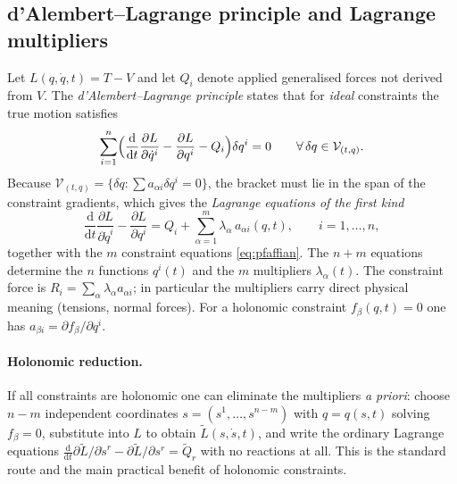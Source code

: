 \documentclass[11pt,a4paper]{article}
\theoremstyle{definition}
\theoremstyle{plain}
\theoremstyle{remark}
\newcommand{\ddt}{\frac{\mathrm{d}}{\mathrm{d}t}}
\newcommand{\pd}[2]{\frac{\partial #1}{\partial #2}}
\begin{document}
\subsection{d'Alembert--Lagrange principle and Lagrange multipliers}\label{sec:dalembert}
Let $L(q,\dot q,t)=T-V$ and let $Q_i$ denote applied generalised forces not derived from
$V$. The \emph{d'Alembert--Lagrange principle} states that for \emph{ideal} constraints the
true motion satisfies
\begin{equation}\label{eq:dalembert}
  \sum_{i=1}^n\Bigl(\ddt\pd L{\dot q^i}-\pd L{q^i}-Q_i\Bigr)\delta q^i=0
  \qquad\forall\,\delta q\in\mathcal V_{(t,q)}.
\end{equation}
Because $\mathcal V_{(t,q)}=\{\delta q:\sum a_{\alpha i}\delta q^i=0\}$, the bracket must lie in the
span of the constraint gradients, which gives the \emph{Lagrange equations of the first kind}
\begin{equation}\label{eq:lagrange-first}
  \boxed{\;\ddt\pd L{\dot q^i}-\pd L{q^i}=Q_i+\sum_{\alpha=1}^m\lambda_\alpha\,a_{\alpha i}(q,t),
  \qquad i=1,\dots,n,\;}
\end{equation}
together with the $m$ constraint equations \eqref{eq:pfaffian}. The $n+m$ equations determine
the $n$ functions $q^i(t)$ and the $m$ multipliers $\lambda_\alpha(t)$. The constraint force
is $R_i=\sum_\alpha\lambda_\alpha a_{\alpha i}$; in particular the multipliers carry
direct physical meaning (tensions, normal forces). For a holonomic constraint $f_\beta(q,t)=0$
one has $a_{\beta i}=\partial f_\beta/\partial q^i$.

\paragraph{Holonomic reduction.} If all constraints are holonomic one can eliminate
the multipliers \emph{a priori}: choose $n-m$ independent coordinates $s=(s^1,\dots,s^{n-m})$
with $q=q(s,t)$ solving $f_\beta=0$, substitute into $L$ to obtain $\tilde L(s,\dot s,t)$, and
write the ordinary Lagrange equations
$\ddt\partial\tilde L/\partial\dot s^r-\partial\tilde L/\partial s^r=\tilde Q_r$ with no reactions at all.
This is the standard route and the main practical benefit of holonomic constraints.
\end{document}
